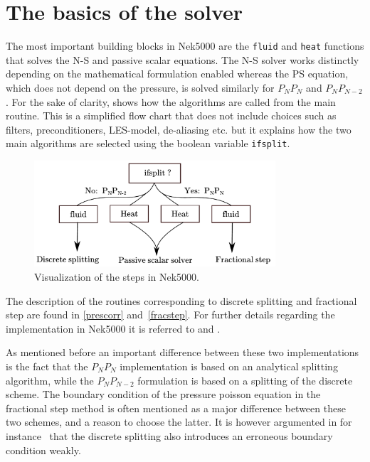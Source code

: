 \section{The basics of the solver}
The most important building blocks in Nek5000 are the \verb|fluid| and \verb|heat| functions that solves the 
N-S and passive scalar equations. The N-S solver works distinctly depending on the mathematical formulation
enabled whereas the PS equation, which does not depend on the pressure, is solved similarly for $P_NP_N$ and $P_NP_{N-2}$. 
For the sake of clarity,  shows how the algorithms are called from the main routine.
This is a simplified flow chart that does not include choices such as filters, preconditioners, LES-model, 
de-aliasing etc. but it explains how the two main algorithms are selected using the boolean variable \verb|ifsplit|. 
%
\begin{figure}[h]
	\centering
	\includegraphics[width=0.8\textwidth]{Figures/Nek.pdf}
	\caption{Visualization of the steps in Nek5000.}
	\label{fig:files}
\end{figure}
%

The description of the routines corresponding to discrete splitting and fractional step are found in 
\cref{prescorr} and~\ref{fracstep}. For further details regarding the 
implementation in Nek5000 it is referred to \cite{Fischer_hybridschwarz-multigrid}
and \cite{TomboulidesPnPn}.

As mentioned before an important difference between these two implementations is the fact that the $P_NP_N$ 
implementation is based on an analytical splitting algorithm, while the $P_NP_{N-2}$ formulation is based on 
a splitting of the discrete scheme. The boundary condition of the pressure poisson equation in the fractional step method
is often mentioned as a major difference between these two schemes, and a reason to choose the latter.
It is however argumented in for instance~\cite{Guermond2006} that the discrete splitting also
introduces an erroneous boundary condition weakly.

